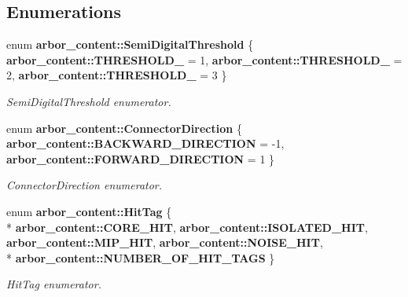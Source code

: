 \subsection*{Enumerations}
\begin{DoxyCompactItemize}
\item 
enum {\bf arbor\+\_\+content\+::\+Semi\+Digital\+Threshold} \{ {\bf arbor\+\_\+content\+::\+T\+H\+R\+E\+S\+H\+O\+L\+D\+\_} = 1, 
{\bf arbor\+\_\+content\+::\+T\+H\+R\+E\+S\+H\+O\+L\+D\+\_} = 2, 
{\bf arbor\+\_\+content\+::\+T\+H\+R\+E\+S\+H\+O\+L\+D\+\_} = 3
 \}
\begin{DoxyCompactList}\small\item\em Semi\+Digital\+Threshold enumerator. \end{DoxyCompactList}\item 
enum {\bf arbor\+\_\+content\+::\+Connector\+Direction} \{ {\bf arbor\+\_\+content\+::\+B\+A\+C\+K\+W\+A\+R\+D\+\_\+\+D\+I\+R\+E\+C\+T\+I\+O\+N} = -\/1, 
{\bf arbor\+\_\+content\+::\+F\+O\+R\+W\+A\+R\+D\+\_\+\+D\+I\+R\+E\+C\+T\+I\+O\+N} = 1
 \}
\begin{DoxyCompactList}\small\item\em Connector\+Direction enumerator. \end{DoxyCompactList}\item 
enum {\bf arbor\+\_\+content\+::\+Hit\+Tag} \{ \\*
{\bf arbor\+\_\+content\+::\+C\+O\+R\+E\+\_\+\+H\+I\+T}, 
{\bf arbor\+\_\+content\+::\+I\+S\+O\+L\+A\+T\+E\+D\+\_\+\+H\+I\+T}, 
{\bf arbor\+\_\+content\+::\+M\+I\+P\+\_\+\+H\+I\+T}, 
{\bf arbor\+\_\+content\+::\+N\+O\+I\+S\+E\+\_\+\+H\+I\+T}, 
\\*
{\bf arbor\+\_\+content\+::\+N\+U\+M\+B\+E\+R\+\_\+\+O\+F\+\_\+\+H\+I\+T\+\_\+\+T\+A\+G\+S}
 \}
\begin{DoxyCompactList}\small\item\em Hit\+Tag enumerator. \end{DoxyCompactList}\end{DoxyCompactItemize}
